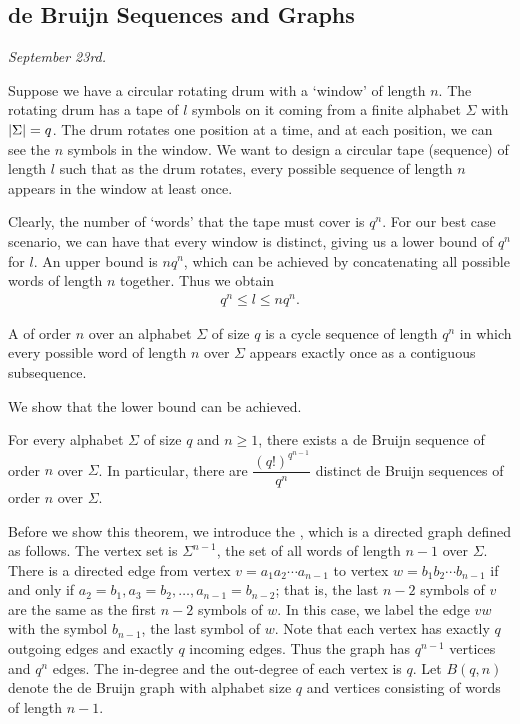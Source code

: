 \subsection{de Bruijn Sequences and Graphs}

\textit{September 23rd.}

Suppose we have a circular rotating drum with a `window' of length $n$. The rotating drum has a tape of $l$ symbols on it coming from a finite alphabet $\Sigma$ with $\left| \Sigma \right| = q$. The drum rotates one position at a time, and at each position, we can see the $n$ symbols in the window. We want to design a circular tape (sequence) of length $l$ such that as the drum rotates, every possible sequence of length $n$ appears in the window at least once.

Clearly, the number of `words' that the tape must cover is $q^{n}$. For our best case scenario, we can have that every window is distinct, giving us a lower bound of $q^{n}$ for $l$. An upper bound is $nq^{n}$, which can be achieved by concatenating all possible words of length $n$ together. Thus we obtain
\begin{align}
    q^{n} \leq l \leq nq^{n}.
\end{align}

\begin{definition}
    A  of order $n$ over an alphabet $\Sigma$ of size $q$ is a cycle sequence of length $q^{n}$ in which every possible word of length $n$ over $\Sigma$ appears exactly once as a contiguous subsequence.
\end{definition}

We show that the lower bound can be achieved.

\begin{theorem}
    For every alphabet $\Sigma$ of size $q$ and $n \geq 1$, there exists a de Bruijn sequence of order $n$ over $\Sigma$. In particular, there are $\dfrac{(q!)^{q^{n-1}}}{q^{n}}$ distinct de Bruijn sequences of order $n$ over $\Sigma$.
\end{theorem}

Before we show this theorem, we introduce the , which is a directed graph defined as follows. The vertex set is $\Sigma^{n-1}$, the set of all words of length $n-1$ over $\Sigma$. There is a directed edge from vertex $v = a_{1}a_{2}\cdots a_{n-1}$ to vertex $w = b_{1}b_{2}\cdots b_{n-1}$ if and only if $a_{2} = b_{1}, a_{3} = b_{2}, \ldots, a_{n-1} = b_{n-2}$; that is, the last $n-2$ symbols of $v$ are the same as the first $n-2$ symbols of $w$. In this case, we label the edge $vw$ with the symbol $b_{n-1}$, the last symbol of $w$. Note that each vertex has exactly $q$ outgoing edges and exactly $q$ incoming edges. Thus the graph has $q^{n-1}$ vertices and $q^{n}$ edges. The in-degree and the out-degree of each vertex is $q$. Let $B(q,n)$ denote the de Bruijn graph with alphabet size $q$ and vertices consisting of words of length $n-1$.

